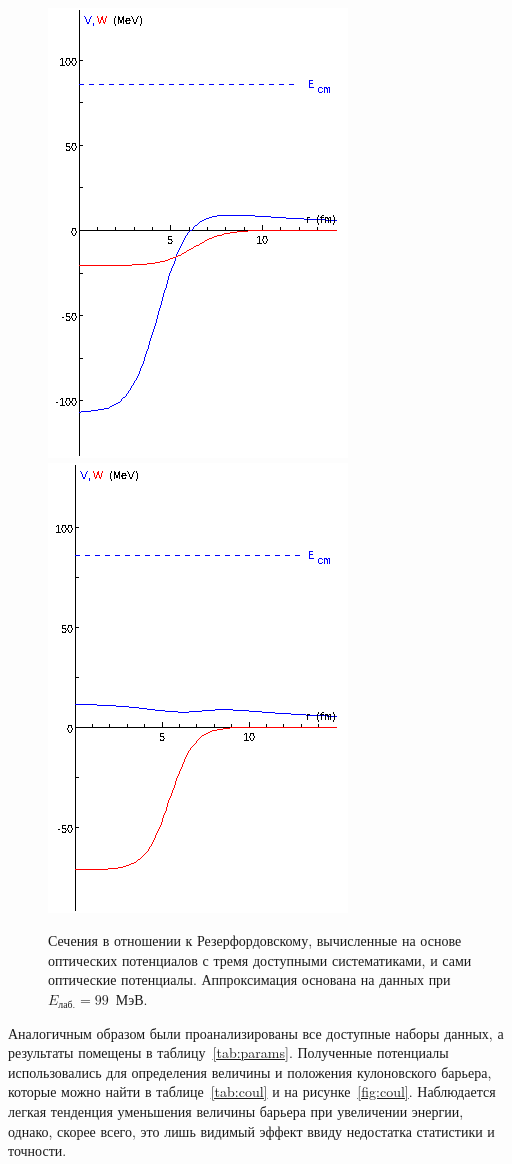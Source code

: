 \documentclass[a4paper, 12pt]{article}
\begin{document}
\begin{figure}
	\includegraphics[width=.32\linewidth]{figures/014-omp2-vw.png}
	\includegraphics[width=.32\linewidth]{figures/014-omp3-vw.png}
	\caption{Сечения в отношении к Резерфордовскому, вычисленные на основе оптических потенциалов с тремя доступными систематиками, и сами оптические потенциалы. Аппроксимация основана на данных при $E_\text{лаб.} = 99$~МэВ.~\cite{99mev}}
	\label{fig:99mev-omp123}
\end{figure}%

Аналогичным образом были проанализированы все доступные наборы данных, 
а результаты помещены в таблицу~\ref{tab:params}. Полученные потенциалы 
использовались для определения величины и положения кулоновского 
барьера, которые можно найти в таблице~\ref{tab:coul} и на 
рисунке~\ref{fig:coul}. Наблюдается легкая тенденция уменьшения величины 
барьера при увеличении энергии, однако, скорее всего, это лишь видимый 
эффект ввиду недостатка статистики и точности.
\end{document}
